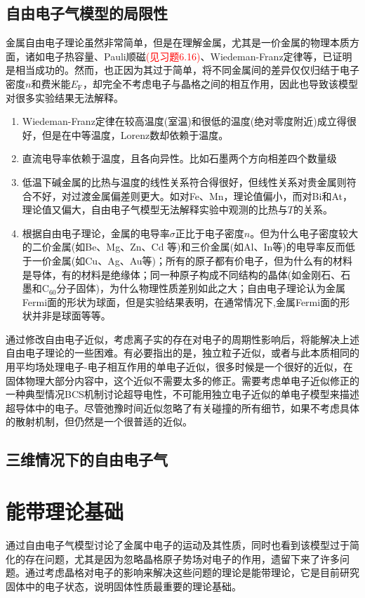 \subsection{自由电子气模型的局限性}
金属自由电子理论虽然非常简单，但是在理解金属，尤其是一价金属的物理本质方面，诸如电子热容量、Pauli顺磁\textcolor{red}{(见习题6.16)}、Wiedeman-Franz定律等，已证明是相当成功的。然而，也正因为其过于简单，将不同金属间的差异仅仅归结于电子密度$n$和费米能$E_{\mathrm{F}}$，却完全不考虑电子与晶格之间的相互作用，因此也导致该模型对很多实验结果无法解释。
\begin{enumerate}
	\item Wiedeman-Franz定律在较高温度(室温)和很低的温度(绝对零度附近)成立得很好，但是在中等温度，Lorenz数却依赖于温度。
	\item 直流电导率依赖于温度，且各向异性。比如石墨两个方向相差四个数量级
	\item 低温下碱金属的比热与温度的线性关系符合得很好，但线性关系对贵金属则符合不好，对过渡金属偏差则更大。如对Fe、Mn，理论值偏小，而对Bi和At，理论值又偏大，自由电子气模型无法解释实验中观测的比热与$T$的关系。

	\item 根据自由电子理论，金属的电导率$\sigma$正比于电子密度$n$。但为什么电子密度较大的二价金属(如Be、Mg、Zn、Cd 等)和三价金属(如Al、In等)的电导率反而低于一价金属(如Cu、Ag、Au等)；所有的原子都有价电子，但为什么有的材料是导体，有的材料是绝缘体；同一种原子构成不同结构的晶体(如金刚石、石墨和$\mathrm{C}_{60}$分子固体)，为什么物理性质差别如此之大；自由电子理论认为金属Fermi面的形状为球面，但是实验结果表明，在通常情况下,金属Fermi面的形状并非是球面等等。
\end{enumerate}

通过修改自由电子近似，考虑离子实的存在对电子的周期性影响后，将能解决上述自由电子理论的一些困难。有必要指出的是，独立粒子近似，或者与此本质相同的用平均场处理电子-电子相互作用的单电子近似，很多时候是一个很好的近似，在固体物理大部分内容中，这个近似不需要太多的修正。需要考虑单电子近似修正的一种典型情况BCS机制讨论超导电性，不可能用独立电子近似的单电子模型来描述超导体中的电子。尽管弛豫时间近似忽略了有关碰撞的所有细节，如果不考虑具体的散射机制，但仍然是一个很普适的近似。

\subsection{三维情况下的自由电子气}

\section{能带理论基础} 
通过自由电子气模型讨论了金属中电子的运动及其性质，同时也看到该模型过于简化的存在问题，尤其是因为忽略晶格原子势场对电子的作用，遗留下来了许多问题。通过考虑晶格对电子的影响来解决这些问题的理论是能带理论，它是目前研究固体中的电子状态，说明固体性质最重要的理论基础。 
